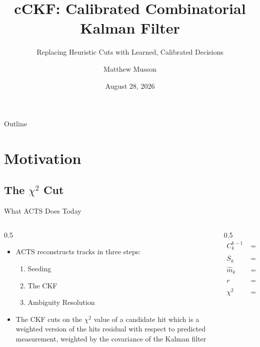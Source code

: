 \documentclass[aspectratio=169]{beamer}
\title{cCKF: Calibrated Combinatorial Kalman Filter}
\subtitle{Replacing Heuristic Cuts with Learned, Calibrated Decisions}
\author{Matthew Musson}
\institute{Stanford University}
\date{August 28, 2026}
\begin{document}
\begin{frame}
  \titlepage
\end{frame}

\begin{frame}{Outline}
  \tableofcontents
\end{frame}

\section{Motivation}

\subsection{The $\chi^2$ Cut}
\begin{frame}{What ACTS Does Today}
  \begin{columns}
    \begin{column}{0.5\textwidth}
      \begin{itemize}
        \item ACTS reconstructs tracks in three steps:
        \begin{enumerate}
          \item Seeding
          \item The CKF
          \item Ambiguity Resolution
        \end{enumerate}
        \item The CKF cuts on the $\chi^2$ value of a candidate hit which is a weighted version of the hits residual with respect to predicted measurement, weighted by the covariance of the Kalman filter
      \end{itemize}
    \end{column}

    \begin{column}{0.5\textwidth}
      \begin{align}     
        C_k^{k-1} &= FC_{k-1}^{k-1}F^T + Q_k\\ 
        S_k &= H_k C_k^{k-1} H_k^\top + R_k \\
        \hat m_k &= H_k\vec x  \\ 
         r &= h_k - \hat{m_k} \\
        \chi^2 &= r^\top S^{-1} r 
      \end{align}
    \end{column}
  \end{columns}
\end{frame}
                                    
\end{document}
